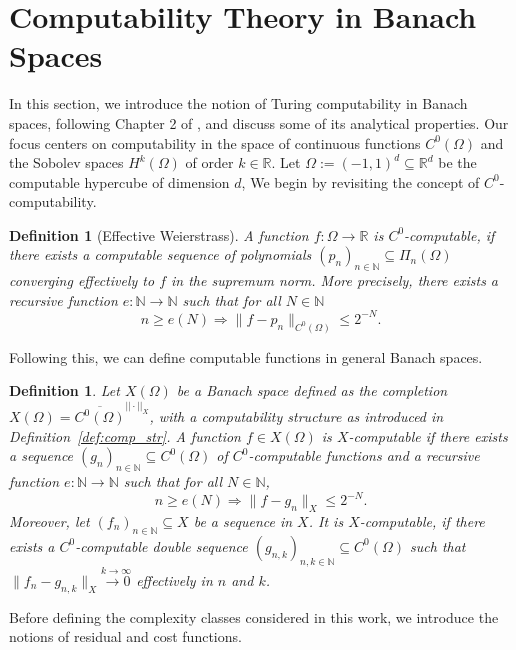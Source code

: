 \documentclass[pdflatex]{sn-jnl}%
\newtheorem{definition}[theorem]{Definition}
\begin{document}
\section{Computability Theory in Banach Spaces}\label{sec:compl_th}
In this section, we introduce the notion of Turing computability in Banach spaces, following Chapter 2 of \cite{Pour-El1989-yg}, and discuss some of its analytical properties. Our focus centers on computability in the space of continuous functions $C^0(\Omega)$ and the Sobolev spaces $H^k(\Omega)$ of order $k \in \mathbb{R}$. Let $\Omega:=(-1,1)^d\subseteq \mathbb{R}^d$ be the computable hypercube of dimension $d$, We begin by revisiting the concept of $C^0$-computability.
\begin{definition}[Effective Weierstrass]\label{def:C_0_comp}
    A function $f:\Omega\rightarrow \mathbb{R}$ is \emph{$C^0$-computable}, if there exists a computable sequence of polynomials $(p_n)_{n\in \mathbb{N}}\subseteq \Pi_{n}(\Omega)$ converging \emph{effectively} to $f$ in the supremum norm. More precisely, there exists a recursive function $e:\mathbb{N}\rightarrow\mathbb{N}$ such that for all $N\in \mathbb{N}$
    \begin{equation}
        n\geq e(N) \Rightarrow \|f-p_n\|_{C^0(\Omega)}\leq 2^{-N}.
    \end{equation}
\end{definition}
Following this, we can define computable functions in general Banach spaces.
\begin{definition}\label{def:comp_bsp}
    Let $X(\Omega)$ be a Banach space  defined as the completion $X(\Omega)=\overline{C^0(\Omega)}^{||\cdot||_X}$, with a computability structure as introduced in Definition~\ref{def:comp_str}. A function $f\in X(\Omega)$ is \emph{$X$-computable} if there exists a sequence $(g_n)_{n\in \mathbb{N}}\subseteq C^0(\Omega)$ of $C^0$-computable functions and a recursive function $e:\mathbb{N}\rightarrow\mathbb{N}$ such that for all $N\in \mathbb{N}$,
    \begin{equation}
        n\geq e(N) \Rightarrow \|f-g_n\|_{X}\leq 2^{-N}.
    \end{equation}
    Moreover, let $(f_n)_{n\in \mathbb{N}}\subseteq X$ be a sequence in $X$. It is \emph{$X$-computable}, if there exists a $C^0$-computable double sequence $(g_{n,k})_{n,k\in \mathbb{N}}\subseteq C^0(\Omega)$ such that $\|f_{n}-g_{n,k}\|_X\stackrel{k\rightarrow\infty}{\longrightarrow 0}$ effectively in $n$ and $k$.
\end{definition}
Before defining the complexity classes considered in this work, we introduce the notions of residual and cost functions. 
\end{document}
